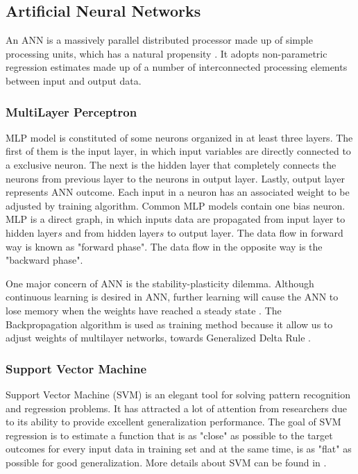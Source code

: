 \documentclass[a4paper,twoside]{article}
\begin{document}
\subsection{Artificial Neural Networks}

\noindent An ANN is a massively parallel distributed processor made up of simple processing units, which has a natural propensity \cite{haykin1994neural}. It adopts non-parametric regression estimates made up of a number of interconnected processing elements between input and output data.


\subsubsection{MultiLayer Perceptron}

\noindent MLP model is constituted of some neurons organized in at least three layers. The first of them is the input layer, in which input variables are directly connected to a exclusive neuron. The next is the hidden layer that completely connects the neurons from previous layer to the neurons in output layer. Lastly, output layer represents ANN outcome. Each input in a neuron has an associated weight to be adjusted by training algorithm. Common MLP models contain one bias neuron. MLP is a direct graph, in which inputs data are propagated from input layer to hidden layer\(s\) and from hidden layer\(s\) to output layer. The data flow in forward way is known as "forward phase". The data flow in the opposite way is the "backward phase".

One major concern of ANN is the stability-plasticity dilemma. Although continuous learning is desired in ANN, further learning will cause the ANN to lose memory when the weights have reached a steady state \cite{haykin1994neural}. The Backpropagation algorithm is used as training method because it allow us to adjust weights of multilayer networks, towards Generalized Delta Rule \cite{rumelhart1985learning}. 

\subsubsection{Support Vector Machine}

\noindent Support Vector Machine (SVM) is an elegant tool for solving pattern recognition and regression problems. It has attracted a lot of attention from researchers due to its ability to provide excellent generalization performance. The goal of SVM regression is to estimate a function that is as "close" as possible to the target outcomes for every input data in training set and at the same time, is as "flat" as possible for good generalization. More details about SVM can be found in \cite{Shevade1999}.
\end{document}
